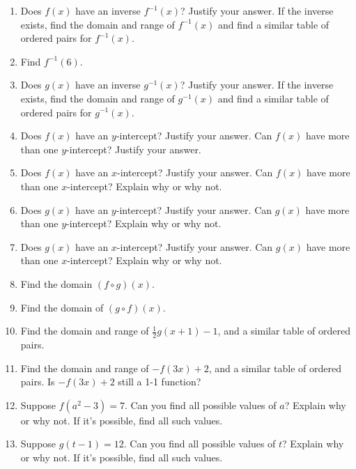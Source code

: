 \documentclass{ximera}
\begin{document}
\begin{exercise}
\begin{enumerate}
\item Does $f(x)$ have an inverse $f^{-1}(x)$? Justify your answer. If the inverse exists, find the domain and range of $f^{-1}(x)$ and find a similar table of ordered pairs for $f^{-1}(x)$. 
\item Find $f^{-1}(6)$.
\item Does $g(x)$ have an inverse $g^{-1}(x)$? Justify your answer. If the inverse exists, find the domain and range of $g^{-1}(x)$ and find a similar table of ordered pairs for $g^{-1}(x)$.
\item Does $f(x)$ have an $y$-intercept? Justify your answer. Can $f(x)$ have more than one $y$-intercept? Justify your answer.
\item Does $f(x)$ have an $x$-intercept? Justify your answer. Can $f(x)$ have more than one $x$-intercept? Explain why or why not.
\item Does $g(x)$ have an $y$-intercept? Justify your answer. Can $g(x)$ have more than one $y$-intercept? Explain why or why not.
\item Does $g(x)$ have an $x$-intercept? Justify your answer. Can $g(x)$ have more than one $x$-intercept? Explain why or why not.
\item Find the domain $(f\circ g)(x)$.
\item Find the domain of $(g\circ f)(x)$. 

\item Find the domain and range of $\displaystyle \frac{1}{2}g(x+1)-1$, and a similar table of ordered pairs.
\item Find the domain and range of $-f(3x)+2$, and a similar table of ordered pairs. Is $-f(3x)+2$ still a 1-1 function?
\item Suppose $f(a^2-3)=7$. Can you find all possible values of $a$? Explain why or why not. If it's possible, find all such values. 
\item Suppose $g(t-1)=12$. Can you find all possible values of $t$? Explain why or why not. If it's possible, find all such values.
\end{enumerate}
\end{exercise}
\end{document}
